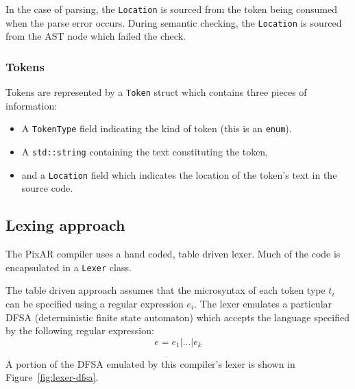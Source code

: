 \documentclass[11pt,a4paper]{scrartcl}
\begin{document}
In the case of parsing, the \verb|Location| is sourced from the token being consumed when the parse error occurs. During semantic checking, the \verb|Location| is sourced from the AST node which failed the check.

\subsubsection{Tokens}

Tokens are represented by a \verb|Token| struct which contains three pieces of information:
\begin{itemize}
  \item A \verb|TokenType| field indicating the kind of token (this is an \verb|enum|).
  \item A \verb|std::string| containing the text constituting the token,
  \item and a \verb|Location| field which indicates the location of the token's text in the source code.
\end{itemize}

\subsection{Lexing approach}

The PixAR compiler uses a hand coded, table driven lexer. Much of the code is encapsulated in a \verb|Lexer| class.

The table driven approach\cite{cooper2011} assumes that the microsyntax of each token type $t_{i}$ can be specified using a regular expression $e_{i}$. The lexer emulates a particular DFSA (deterministic finite state automaton) which accepts the language specified by the following regular expression:
$$ e = e_{1} | ... | e_{k} $$

A portion of the DFSA emulated by this compiler's lexer is shown in Figure~\ref{fig:lexer-dfsa}.
\end{document}
